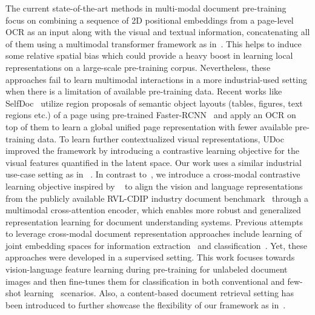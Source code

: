 \documentclass[preprint,review,12pt]{elsarticle}
\begin{document}
The current state-of-the-art methods in multi-modal document pre-training~\cite{xu2020layoutlmv2,huang2022layoutlmv3, appalaraju2021docformer} focus on combining a sequence of 2D positional embeddings from a page-level OCR as an input along with the visual and textual information, concatenating all of them using a multimodal transformer framework as in~\cite{powalski2021going, biten2022latr}. This helps to induce some relative spatial bias which could provide a heavy boost in learning local representations on a large-scale pre-training corpus. Nevertheless, these approaches fail to learn multimodal interactions in a more industrial-used setting when there is a limitation of available pre-training data. Recent works like SelfDoc~\cite{li2021selfdoc} utilize region proposals of semantic object layouts (tables, figures, text regions etc.) of a page using pre-trained Faster-RCNN~\cite{faster2015towards} and apply an OCR on top of them to learn a global unified page representation with fewer available pre-training data. To learn further contextualized visual representations, UDoc~\cite{Unifieddoc} improved the framework by introducing a contrastive learning objective for the visual features quantified in the latent space. Our work uses a similar industrial use-case setting as in ~\cite{li2021selfdoc, Unifieddoc}. 
In contrast to~\cite{li2021selfdoc,Unifieddoc}, we introduce a cross-modal contrastive learning objective inspired by ~\cite{radford2021learning, li2021align} to align the vision and language representations from the publicly available RVL-CDIP industry document benchmark~\cite{harley2015evaluation} through a multimodal cross-attention encoder, which enables more robust and generalized representation learning for document understanding systems. Previous attempts to leverage cross-modal document representation approaches include learning of joint embedding spaces for information extraction~\cite{zhang2020trie} and classification~\cite{bakkali2023vlcdoc, Dauphinee2019Modular, bakkali2020cross, bakkali2020visual}. Yet, these approaches were developed in a supervised setting. This work focuses towards vision-language feature learning during pre-training for unlabeled document images and then fine-tunes them for classification in both conventional and few-shot learning~\cite{snell2017prototypical} scenarios. Also, a content-based document retrieval setting has been introduced to further showcase the flexibility of our framework as in~\cite{gordo2013large, harley2015evaluation}.
\end{document}

